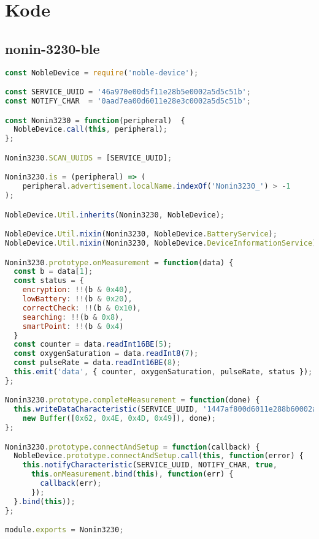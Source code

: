 
\chapter{Kode}

\section{nonin-3230-ble}
\begin{lstlisting}[frame=single, language=JavaScript,
    caption=Nonin 3230 noble-device library, label=lst:nonin-3230-library]
const NobleDevice = require('noble-device');

const SERVICE_UUID = '46a970e00d5f11e28b5e0002a5d5c51b';
const NOTIFY_CHAR  = '0aad7ea00d6011e28e3c0002a5d5c51b';

const Nonin3230 = function(peripheral)  {
  NobleDevice.call(this, peripheral);
};

Nonin3230.SCAN_UUIDS = [SERVICE_UUID];

Nonin3230.is = (peripheral) => (
    peripheral.advertisement.localName.indexOf('Nonin3230_') > -1
);

NobleDevice.Util.inherits(Nonin3230, NobleDevice);

NobleDevice.Util.mixin(Nonin3230, NobleDevice.BatteryService);
NobleDevice.Util.mixin(Nonin3230, NobleDevice.DeviceInformationService);

Nonin3230.prototype.onMeasurement = function(data) {
  const b = data[1];
  const status = {
    encryption: !!(b & 0x40),
    lowBattery: !!(b & 0x20),
    correctCheck: !!(b & 0x10),
    searching: !!(b & 0x8),
    smartPoint: !!(b & 0x4)
  }
  const counter = data.readInt16BE(5);
  const oxygenSaturation = data.readInt8(7);
  const pulseRate = data.readInt16BE(8);
  this.emit('data', { counter, oxygenSaturation, pulseRate, status });
};

Nonin3230.prototype.completeMeasurement = function(done) {
  this.writeDataCharacteristic(SERVICE_UUID, '1447af800d6011e288b60002a5d5c51b',
    new Buffer([0x62, 0x4E, 0x4D, 0x49]), done);
};

Nonin3230.prototype.connectAndSetup = function(callback) {
  NobleDevice.prototype.connectAndSetup.call(this, function(error) {
    this.notifyCharacteristic(SERVICE_UUID, NOTIFY_CHAR, true,
      this.onMeasurement.bind(this), function(err) {
        callback(err);
      });
  }.bind(this));
};

module.exports = Nonin3230;

\end{lstlisting}
